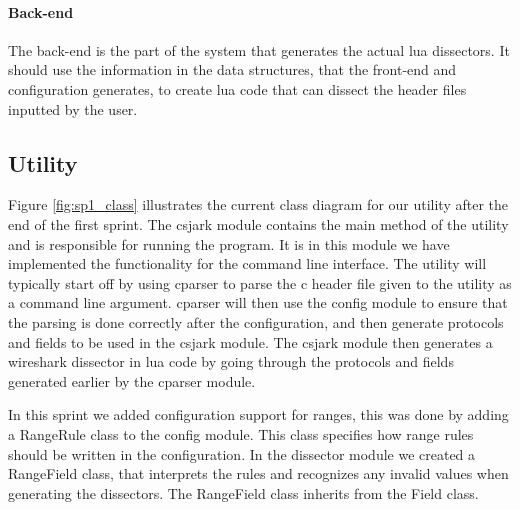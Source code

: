 \paragraph{Back-end}
The back-end is the part of the system that generates the actual \Gls{lua} \glspl{dissector}.
It should use the information in the data structures, that the 
front-end and configuration generates, to create \Gls{lua} code that can dissect
the \gls{header} files inputted by the user. 

\subsection{Utility}
Figure \ref{fig:sp1_class} illustrates the current class diagram for our
\gls{utility} after the end of the first sprint. The csjark module contains the main
method of the \gls{utility} and is responsible for running the program.
It is in this module we have implemented the functionality for the command line interface.
The \gls{utility} will typically start off by using cparser to parse the \Gls{c} \gls{header} file given to
the \gls{utility} as a command line argument. cparser will then use the config module
to ensure that the parsing is done correctly after the configuration, and then
generate protocols and fields to be used in the csjark module. The csjark
module then generates a \Gls{wireshark} \gls{dissector} in \Gls{lua} code by going through the
protocols and fields generated earlier by the cparser module.

In this sprint we added configuration support for ranges, this was done 
by adding a RangeRule class to the config module. This class specifies how
range rules should be written in the configuration. In the \gls{dissector} module
we created a RangeField class, that interprets the rules
and recognizes any invalid values when generating the \glspl{dissector}.
The RangeField class inherits from the Field class.


